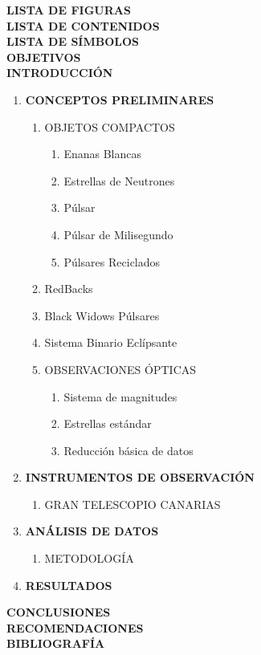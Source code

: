 \noindent \textbf{LISTA DE FIGURAS}\\
\textbf{LISTA DE CONTENIDOS}\\
\textbf{LISTA DE SÍMBOLOS}\\
\textbf{OBJETIVOS}\\
\textbf{INTRODUCCIÓN}
\begin{enumerate}[leftmargin=0.5cm, label=\textbf{\arabic*}.]
    \item \textbf{CONCEPTOS PRELIMINARES}
    \begin{enumerate}[label=1.\arabic*.]
        \item OBJETOS COMPACTOS
        \begin{enumerate}[label=1.1.\arabic*.]
            \item Enanas Blancas
            \item Estrellas de Neutrones
            \item P\'ulsar
            \item P\'ulsar de Milisegundo
            \item P\'ulsares Reciclados
        \end{enumerate}
        \item RedBacks
        \item Black Widows P\'ulsares
        \item Sistema Binario Eclípsante
        \item OBSERVACIONES ÓPTICAS
        \begin{enumerate}[label=1.5.\arabic*.]
            \item Sistema de magnitudes
            \item Estrellas estándar
            \item Reducción básica de datos
        \end{enumerate}
    \end{enumerate}
    \item \textbf{INSTRUMENTOS DE OBSERVACIÓN}
    \begin{enumerate}[label=2.\arabic*.]
        \item GRAN TELESCOPIO CANARIAS
    \end{enumerate}
    
    \item \textbf{ANÁLISIS DE DATOS}
    \begin{enumerate}[label=3.\arabic*.]
        \item METODOLOGÍA
    \end{enumerate}
    \item \textbf{RESULTADOS}
\end{enumerate}
\textbf{CONCLUSIONES}\\
\textbf{RECOMENDACIONES}\\
\textbf{BIBLIOGRAFÍA}

